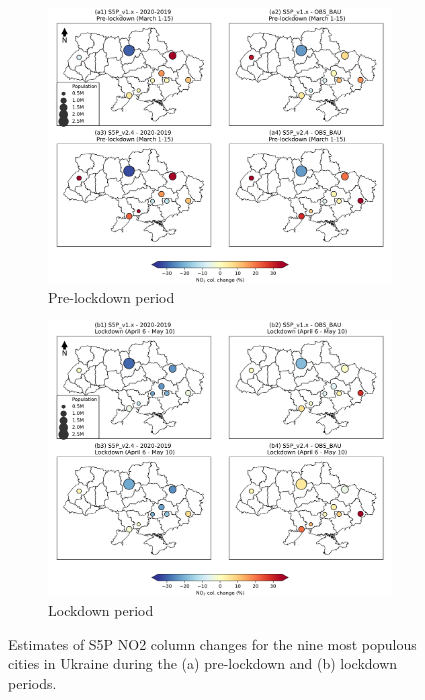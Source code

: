 \begin{figure}[p]
    \centering
    \begin{subfigure}{\textwidth}
      \centering
      \includegraphics[width=.8\textwidth]{figs/chap3/fig5_a.png}
      \caption{Pre-lockdown period}
      \label{fig:chap3_fig5a}
    \end{subfigure}

    \begin{subfigure}{\textwidth}
      \centering
      \includegraphics[width=.8\textwidth]{figs/chap3/fig5_b.png}
      \caption{Lockdown period}
      \label{fig:chap3_fig5b}
    \end{subfigure}
    \caption[S5P NO2 level changes for most populous cities]{Estimates of S5P NO2 column changes for the nine most populous cities in Ukraine during the (a) pre-lockdown and (b) lockdown periods.}
    \label{fig:chap3_fig5}
\end{figure}

